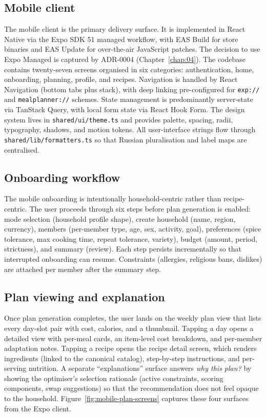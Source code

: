\subsection{Mobile client}

The mobile client is the primary delivery surface. It is implemented in React Native via the Expo SDK 51 managed workflow, with EAS Build for store binaries and EAS Update for over-the-air JavaScript patches. The decision to use Expo Managed is captured by ADR-0004 (Chapter~\ref{chap:04}). The codebase contains twenty-seven screens organised in six categories: authentication, home, onboarding, planning, profile, and recipes. Navigation is handled by React Navigation (bottom tabs plus stack), with deep linking pre-configured for \texttt{exp://} and \texttt{mealplanner://} schemes. State management is predominantly server-state via TanStack Query, with local form state via React Hook Form. The design system lives in \texttt{shared/ui/theme.ts} and provides palette, spacing, radii, typography, shadows, and motion tokens. All user-interface strings flow through \texttt{shared/lib/formatters.ts} so that Russian pluralisation and label maps are centralised.

\subsection{Onboarding workflow}

The mobile onboarding is intentionally household-centric rather than recipe-centric. The user proceeds through six steps before plan generation is enabled: mode selection (household profile shape), create household (name, region, currency), members (per-member type, age, sex, activity, goal), preferences (spice tolerance, max cooking time, repeat tolerance, variety), budget (amount, period, strictness), and summary (review). Each step persists incrementally so that interrupted onboarding can resume. Constraints (allergies, religious bans, dislikes) are attached per member after the summary step.

\subsection{Plan viewing and explanation}

Once plan generation completes, the user lands on the weekly plan view that lists every day-slot pair with cost, calories, and a thumbnail. Tapping a day opens a detailed view with per-meal cards, an item-level cost breakdown, and per-member adaptation notes. Tapping a recipe opens the recipe detail screen, which renders ingredients (linked to the canonical catalog), step-by-step instructions, and per-serving nutrition. A separate ``explanations'' surface answers \emph{why this plan?} by showing the optimiser's selection rationale (active constraints, scoring components, swap suggestions) so that the recommendation does not feel opaque to the household. Figure~\ref{fig:mobile-plan-screens} captures these four surfaces from the Expo client.

